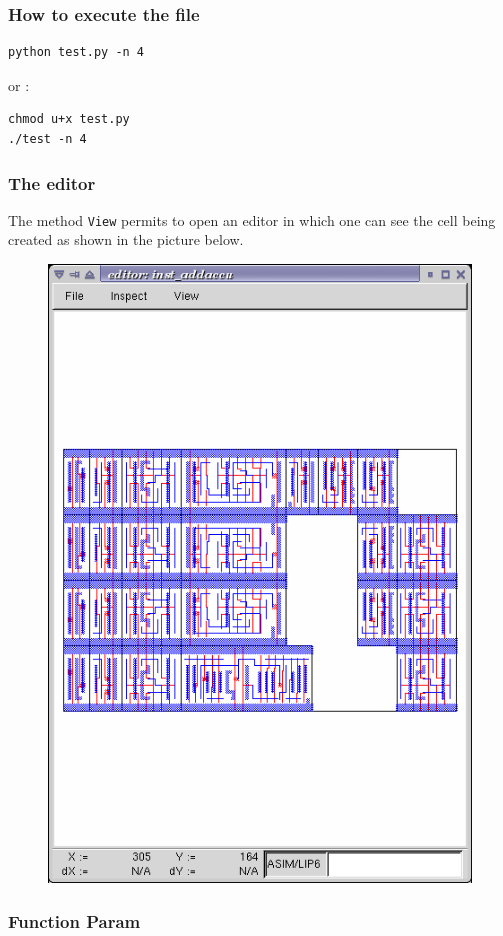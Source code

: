\subsubsection{How to execute the file}

\begin{verbatim}
python test.py -n 4
\end{verbatim}
\indent or :
\begin{verbatim}
chmod u+x test.py
./test -n 4
\end{verbatim}

\subsubsection{The editor}

The method \verb-View- permits to open an editor in which one can see the cell being created as shown in the picture below.
\begin{figure}[h!]
\centering
\includegraphics[width=.8\textwidth]{./images/editor}
\end{figure}

\newpage
\subsubsection{Function Param}

